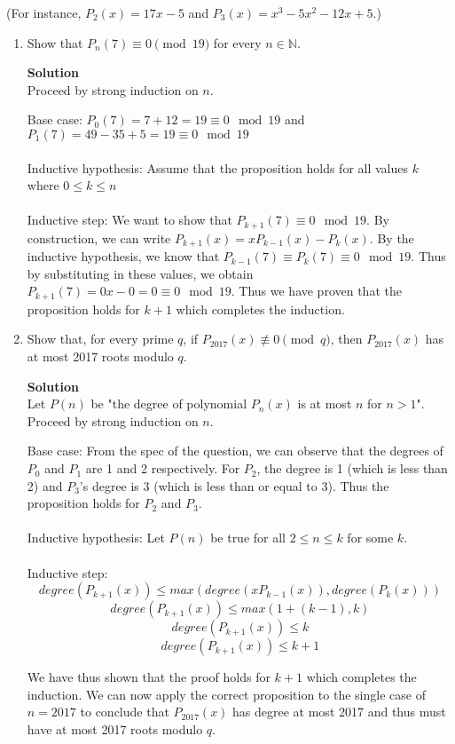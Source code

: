 \documentclass[11pt]{article}
\newenvironment{Parts}{\begin{enumerate}[label=(\alph*)]}{\end{enumerate}}
\newcommand*{\Part}{\item}
\newenvironment{Answer}{\vspace{10pt}\begin{mdframed}\textbf{Solution}\\}{\end{mdframed}\vfill\pagebreak[3]}
\newenvironment{Answer}{\vspace{10pt}}{\vfill\pagebreak[3]}
\newcommand*{\N}{\mathbb{N}}
\begin{document}
  (For instance, $P_2(x) = 17x-5$ and $P_3(x) = x^3 - 5x^2 - 12x + 5$.)
  \begin{Parts}
  \Part Show that $P_n(7) \equiv 0 \pmod{19}$ for every $n\in \N$.
  \begin{Answer}
    Proceed by strong induction on $n$.
    
    Base case: $P_0(7)=7+12=19\equiv 0 \mod 19$ and $P_1(7)=49-35+5=19 \equiv 0 \mod 19$ \\
    \\
    Inductive hypothesis: Assume that the proposition holds for all values $k$ where $0 \leq k \leq n$ \\
    \\
    Inductive step: We want to show that $P_{k+1}(7) \equiv 0 \mod 19$. By construction, we can write $P_{k+1}(x)=xP_{k-1}(x)-P_k(x)$. By the inductive hypothesis, we know that $P_{k-1}(7)\equiv P_k(7) \equiv 0 \mod 19$. Thus by substituting in these values, we obtain  $P_{k+1}(7)=0x-0=0 \equiv 0 \mod 19$. Thus we have proven that the proposition holds for $k+1$ which completes the induction.
  \end{Answer}
  
  \Part Show that, for every prime $q$, if $P_{2017}(x) \not\equiv 0 \pmod{q}$, then $P_{2017}(x)$ has at most 2017 roots modulo $q$.\\
  \begin{Answer}
    Let $P(n)$ be "the degree of polynomial $P_n(x)$ is at most $n$ for $n>1$". Proceed by strong induction on $n$.
    
    Base case: From the spec of the question, we can observe that the degrees of $P_0$ and $P_1$ are 1 and 2 respectively. For $P_2$, the degree is 1 (which is less than 2) and $P_3$'s degree is 3 (which is less than or equal to 3). Thus the proposition holds for $P_2$ and $P_3$.\\
    \\
    Inductive hypothesis: Let $P(n)$ be true for all $2 \leq n \leq k$ for some $k$.\\
    \\
    Inductive step: $$degree(P_{k+1}(x))\leq max(degree(xP_{k-1}(x)),degree(P_{k}(x)))$$
    $$degree(P_{k+1}(x))\leq max(1+(k-1),k)$$
    $$degree(P_{k+1}(x))\leq k$$
    $$degree(P_{k+1}(x))\leq k+1$$
    
    We have thus shown that the proof holds for $k+1$ which completes the induction. We can now apply the correct proposition to the single case of $n=2017$ to conclude that $P_{2017}(x)$ has degree at most 2017 and thus must have at most 2017 roots modulo $q$.
  \end{Answer}
  \end{Parts}

\end{document}
